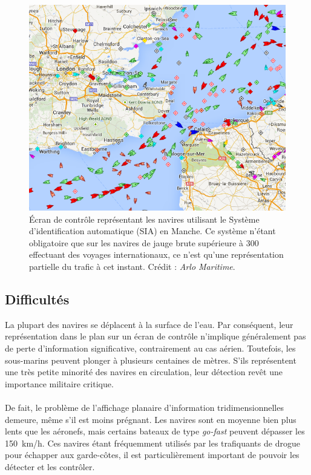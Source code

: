 	
	\begin{figure}[H]
		\centering
		\includegraphics[width=\textwidth]{figures/channel}
		\caption{Écran de contrôle représentant les navires utilisant le Système d'identification automatique (SIA) en Manche. Ce système n'étant obligatoire que sur les navires de jauge brute supérieure à 300 effectuant des voyages internationaux, ce n'est qu'une représentation partielle du trafic à cet instant. Crédit : \emph{Arlo Maritime}.}
		\label{fig:channel}
	\end{figure}
	
	\subsection{Difficultés}
	La plupart des navires se déplacent à la surface de l'eau. Par conséquent, leur représentation dans le plan sur un écran de contrôle n'implique généralement pas de perte d'information significative, contrairement au cas aérien. Toutefois, les sous-marins peuvent plonger à plusieurs centaines de mètres. S'ils représentent une très petite minorité des navires en circulation, leur détection revêt une importance militaire critique.
	
	\paragraph*{}
	De fait, le problème de l'affichage planaire d'information tridimensionnelles demeure, même s'il est moins prégnant. Les navires sont en moyenne bien plus lents que les aéronefs, mais certains bateaux de type \emph{go-fast} peuvent dépasser les 150~km/h. Ces navires étant fréquemment utilisés par les trafiquants de drogue pour échapper aux garde-côtes, il est particulièrement important de pouvoir les détecter et les contrôler.
	
